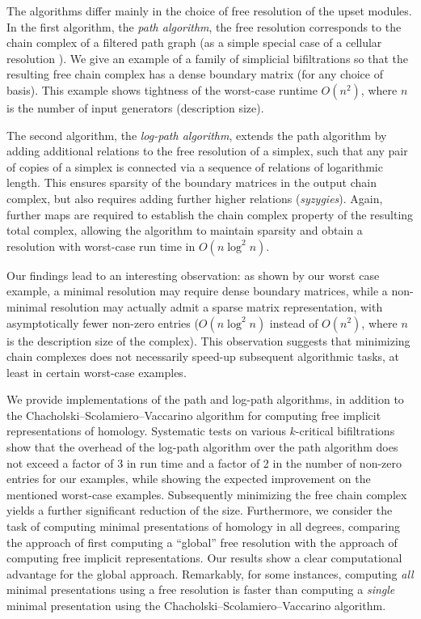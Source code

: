 \documentclass[a4paper,UKenglish,cleveref,nolineno,autoref]{socg-lipics-v2021}
\newcommand{\define}[1]{\emph{#1}} %
\begin{document}
The algorithms differ mainly in the choice of free resolution of the upset modules. 
In the first algorithm, the \define{path algorithm}, the free resolution corresponds to the chain complex of a filtered path graph (as a simple special case of a cellular resolution \cite{bayer_sturmfels_cellular,miller_sturmfels_book}).
We give an example of a family of simplicial bifiltrations so that the resulting free chain complex has a dense boundary matrix (for any choice of basis).
This example shows tightness of the worst-case runtime $O(n^2)$, where $n$ is the number of input generators (description size). 


The second algorithm, the \define{log-path algorithm}, extends the path algorithm by adding additional relations to the free resolution of a simplex, such that any pair of copies of a simplex is connected via a sequence of relations of logarithmic length.
This ensures sparsity of the boundary matrices in the output chain complex, but also requires adding further higher relations (\define{syzygies}). 
Again, further maps are required to establish the chain complex property of the resulting total complex, allowing the algorithm to maintain sparsity and obtain a resolution with worst-case run time in $O(n\log^2n)$.



Our findings lead to  an interesting observation: as shown by our worst case example, a minimal resolution may require dense boundary matrices, while a non-minimal resolution may actually admit a sparse matrix representation, with asymptotically fewer non-zero entries ($O(n\log^2n)$ instead of $O(n^2)$, where $n$ is the description size of the complex).
This observation suggests that minimizing chain complexes does not necessarily speed-up subsequent algorithmic tasks, at least in certain worst-case examples.



We provide implementations of the path and log-path algorithms, in addition to the Chacholski--Scolamiero--Vaccarino algorithm for computing free implicit representations of homology.
Systematic tests on various $k$-critical bifiltrations show that the overhead of the log-path algorithm over the path algorithm does not exceed a factor of 3 in run time and a factor of 2 in the number of non-zero entries for our examples, while showing the expected improvement on the mentioned worst-case examples. 
Subsequently minimizing the free chain complex yields a further significant reduction of the size.
Furthermore, we consider the task of computing minimal presentations of homology in all degrees, comparing the approach of first computing a ``global'' free resolution with the approach of computing free implicit representations.
Our results show a clear computational advantage for the global approach.
Remarkably, for some instances, computing \emph{all} minimal
presentations using a free resolution is faster than computing a \emph{single} minimal presentation using the Chacholski--Scolamiero--Vaccarino algorithm.
\end{document}

